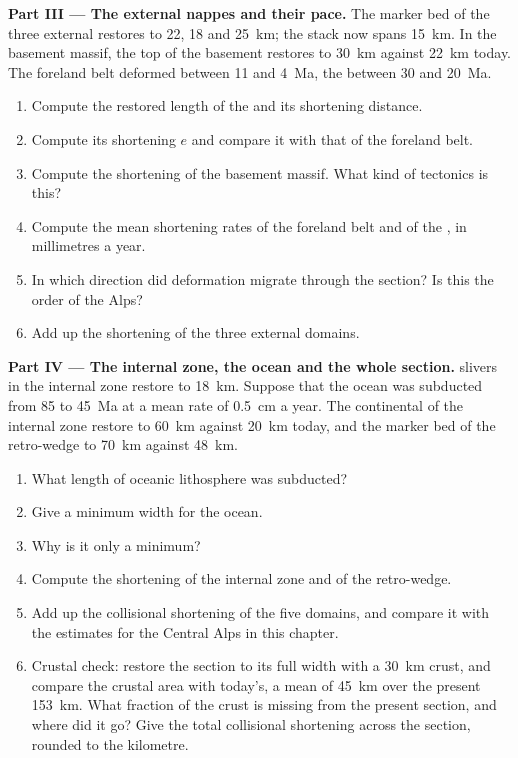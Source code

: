 \begin{problem}
\noindent\textbf{Part III --- The external nappes and their pace.} The marker bed of the
three external  restores to 22, 18 and \qty{25}{km}; the stack now spans
\qty{15}{km}. In the basement massif, the top of the basement restores to \qty{30}{km}
against \qty{22}{km} today. The foreland belt deformed between 11 and \qty{4}{Ma}, the
 between 30 and \qty{20}{Ma}.
\begin{enumerate}[resume]
\item Compute the restored length of the  and its shortening distance.
\item Compute its shortening $e$ and compare it with that of the foreland belt.
\item Compute the shortening of the basement massif. What kind of tectonics is this?
\item Compute the mean shortening rates of the foreland belt and of the , in
millimetres a year.
\item In which direction did deformation migrate through the section? Is this the order
of the Alps?
\item Add up the shortening of the three external domains.
\end{enumerate}

\noindent\textbf{Part IV --- The internal zone, the ocean and the whole section.}
 slivers in the internal zone restore to \qty{18}{km}. Suppose that the ocean was
subducted from 85 to \qty{45}{Ma} at a mean rate of \qty{0.5}{cm} a year. The continental
 of the internal zone restore to \qty{60}{km} against \qty{20}{km} today, and the
marker bed of the retro-wedge to \qty{70}{km} against \qty{48}{km}.
\begin{enumerate}[resume]
\item What length of oceanic lithosphere was subducted?
\item Give a minimum width for the ocean.
\item Why is it only a minimum?
\item Compute the shortening of the internal zone and of the retro-wedge.
\item Add up the collisional shortening of the five domains, and compare it with the
estimates for the Central Alps in this chapter.
\item Crustal check: restore the section to its full width with a \qty{30}{km} crust, and
compare the crustal area with today's, a mean of \qty{45}{km} over the present
\qty{153}{km}. What fraction of the crust is missing from the present section, and where
did it go? Give the total collisional shortening across the section, rounded to the
kilometre.
\end{enumerate}
\end{problem}
